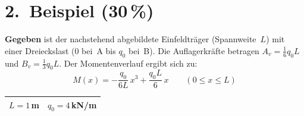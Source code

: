 \documentclass[a4paper,11pt]{article}
\begin{document}
\newpage
\section*{2.~Beispiel \hfill (30\,\%)}

\textbf{Gegeben} ist der nachstehend abgebildete Einfeldträger (Spannweite~$L$)
mit einer Dreieckslast (0 bei~A bis $q_0$ bei~B).
Die Auflagerkräfte betragen $A_v = \tfrac{1}{6}q_0 L$ und $B_v = \tfrac{1}{3}q_0 L$.
Der Momentenverlauf ergibt sich zu:
\[
  M(x) = -\frac{q_0}{6L}\,x^3 + \frac{q_0 L}{6}\,x
  \qquad (0 \le x \le L)
\]

\begin{tabular}{|c|c|}
\hline
$L = 1$\,m & $q_0 = 4$\,kN/m \\
\hline
\end{tabular}
\end{document}
